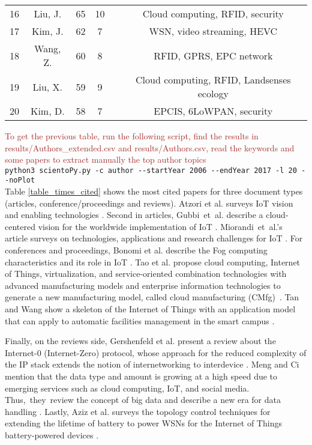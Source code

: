 \documentclass[symmetry,article,accept,moreauthors,pdftex10pt,a4paper]{mdpi}
\begin{document}
\begin{table}[H]
{\begin{tabular}{cccccc}
		16 & Liu, J. & 65 & 10 & \cite{Sun20101} & Cloud computing, RFID, security \\
		17 & Kim, J. & 62 & 7 & \cite{Lim2015375} & WSN, video streaming, HEVC \\
		18 & Wang, Z. & 60 & 8 & \cite{Guo20131531} & RFID, GPRS, EPC network \\
		19 & Liu, X. & 59 & 9 & \cite{Li20131147} & Cloud computing, RFID, Landsenses ecology \\
		20 & Kim, D. & 58 & 7 & \cite{Hong201034} & EPCIS, 6LoWPAN, security \\
    	\bottomrule
	\end{tabular}}
\end{table}

\noindent
\textcolor{brown}{To get the previous table, run the following script, find the results in results/Authors\_extended.csv and results/Authors.csv, read the keywords and some papers to extract manually the top author topics}\\
\hspace*{0.5cm}\verb|python3 scientoPy.py -c author --startYear 2006 --endYear 2017 -l 20 --noPlot|\\


Table \ref{table_times_cited} shows the most cited papers for three document types (articles, conference/proceedings and reviews). Atzori et al. surveys IoT vision and enabling technologies \cite{Atzori20102787}. Second in articles, Gubbi~et~al. describe a cloud-centered vision for the worldwide implementation of IoT \cite{Gubbi20131645}. Miorandi~et~al.'s article surveys on technologies, applications and research challenges for IoT \cite{Miorandi20121497}. 
For conferences and proceedings, Bonomi et al. describe the Fog computing characteristics and its role in IoT \cite{Bonomi201213}. Tao et al. propose cloud computing, Internet of Things, virtualization, and service-oriented combination technologies with advanced manufacturing models and enterprise information technologies to generate a new manufacturing model, called cloud manufacturing (CMfg)~\cite{Tao20111969}. Tan and Wang show a skeleton of the Internet of Things with an application model that can apply to automatic facilities management in the smart campus \cite{Tan2010}.

Finally, on the reviews side, Gershenfeld et al. present a review about the Internet-0 (Internet-Zero) protocol, whose approach for the reduced complexity of the IP stack extends the notion of internetworking to interdevice \cite{Gershenfeld200476}. Meng and Ci mention that the data type and amount is growing at a high speed due to emerging  services such as cloud computing, IoT, and social media. Thus,~they~review the concept of big data and describe a new era for data handling \cite{Meng2013146}. Lastly, Aziz et al. surveys the topology control techniques for extending the lifetime of battery to power WSNs for the Internet of Things battery-powered devices \cite{Aziz2013121}.
\end{document}

